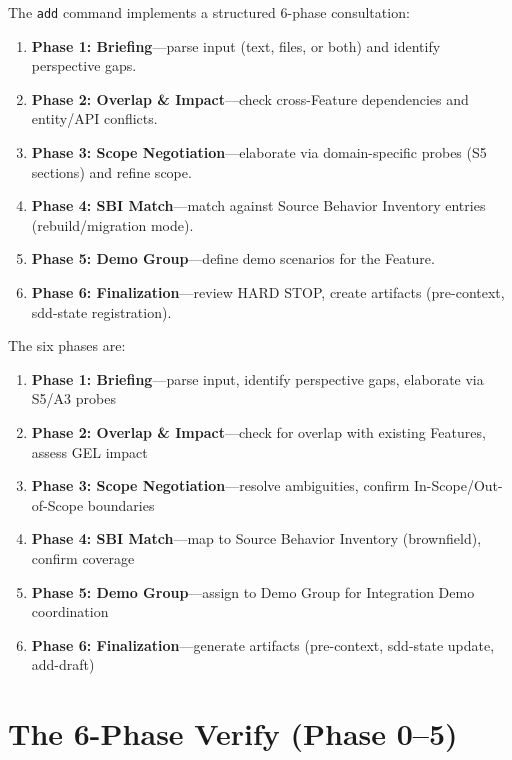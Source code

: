 \documentclass[11pt,a4paper,openright,twoside]{report}
\begin{document}
The \texttt{add} command implements a structured 6-phase consultation:

\begin{enumerate}
  \item \textbf{Phase 1: Briefing}---parse input (text, files, or both) and identify perspective gaps.
  \item \textbf{Phase 2: Overlap \& Impact}---check cross-Feature dependencies and entity/API conflicts.
  \item \textbf{Phase 3: Scope Negotiation}---elaborate via domain-specific probes (S5 sections) and refine scope.
  \item \textbf{Phase 4: SBI Match}---match against Source Behavior Inventory entries (rebuild/migration mode).
  \item \textbf{Phase 5: Demo Group}---define demo scenarios for the Feature.
  \item \textbf{Phase 6: Finalization}---review HARD STOP, create artifacts (pre-context, sdd-state registration).
\end{enumerate}

The six phases are:
\begin{enumerate}[nosep]
  \item \textbf{Phase 1: Briefing}---parse input, identify perspective gaps, elaborate via S5/A3 probes
  \item \textbf{Phase 2: Overlap \& Impact}---check for overlap with existing Features, assess GEL impact
  \item \textbf{Phase 3: Scope Negotiation}---resolve ambiguities, confirm In-Scope/Out-of-Scope boundaries
  \item \textbf{Phase 4: SBI Match}---map to Source Behavior Inventory (brownfield), confirm coverage
  \item \textbf{Phase 5: Demo Group}---assign to Demo Group for Integration Demo coordination
  \item \textbf{Phase 6: Finalization}---generate artifacts (pre-context, sdd-state update, add-draft)
\end{enumerate}

\section{The 6-Phase Verify (Phase 0--5)}
\end{document}
